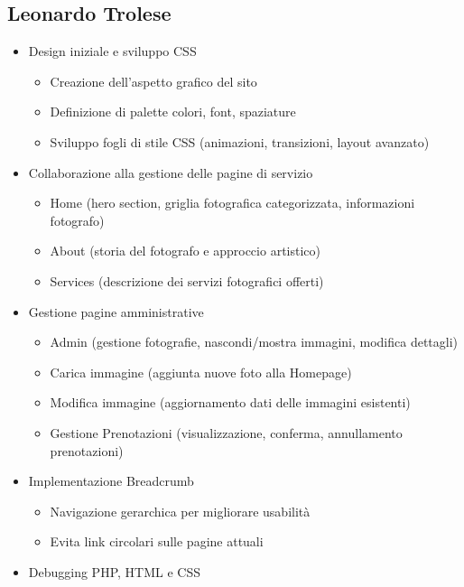 \subsection{Leonardo Trolese}
\begin{itemize}
    \item Design iniziale e sviluppo CSS
    \begin{itemize}
        \item Creazione dell’aspetto grafico del sito
        \item Definizione di palette colori, font, spaziature
        \item Sviluppo fogli di stile CSS (animazioni, transizioni, layout avanzato)
    \end{itemize}
    \item Collaborazione alla gestione delle pagine di servizio
    \begin{itemize}
        \item Home (hero section, griglia fotografica categorizzata, informazioni fotografo)
        \item About (storia del fotografo e approccio artistico)
        \item Services (descrizione dei servizi fotografici offerti)
    \end{itemize}
    \item Gestione pagine amministrative
    \begin{itemize}
        \item Admin (gestione fotografie, nascondi/mostra immagini, modifica dettagli)
        \item Carica immagine (aggiunta nuove foto alla Homepage)
        \item Modifica immagine (aggiornamento dati delle immagini esistenti)
        \item Gestione Prenotazioni (visualizzazione, conferma, annullamento prenotazioni)
    \end{itemize}
    \item Implementazione Breadcrumb
    \begin{itemize}
        \item Navigazione gerarchica per migliorare usabilità
        \item Evita link circolari sulle pagine attuali
    \end{itemize}
    \item Debugging PHP, HTML e CSS
\end{itemize}

